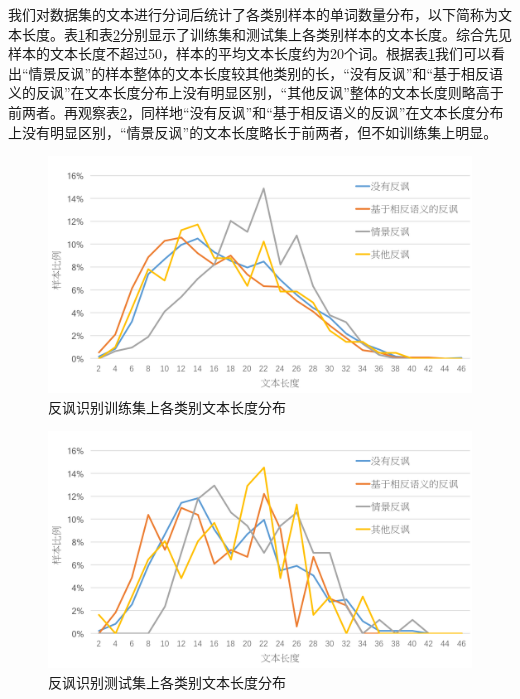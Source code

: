 我们对数据集的文本进行分词后统计了各类别样本的单词数量分布，以下简称为文本长度。表\ref{fig:semeval2018_task3_train_class_len}和表\ref{fig:semeval2018_task3_test_class_len}分别显示了训练集和测试集上各类别样本的文本长度。综合先见样本的文本长度不超过50，样本的平均文本长度约为20个词。根据表\ref{fig:semeval2018_task3_train_class_len}我们可以看出“情景反讽”的样本整体的文本长度较其他类别的长，“没有反讽”和“基于相反语义的反讽”在文本长度分布上没有明显区别，“其他反讽”整体的文本长度则略高于前两者。再观察表\ref{fig:semeval2018_task3_test_class_len}，同样地“没有反讽”和“基于相反语义的反讽”在文本长度分布上没有明显区别，“情景反讽”的文本长度略长于前两者，但不如训练集上明显。

\begin{figure}[H]
  \centering
  \includegraphics[width=\textwidth]{img/semeval2018_task3_train_class_len.png}
  \caption{反讽识别训练集上各类别文本长度分布}
  \label{fig:semeval2018_task3_train_class_len}
\end{figure}

\begin{figure}[H]
  \centering
  \includegraphics[width=\textwidth]{img/semeval2018_task3_test_class_len.png}
  \caption{反讽识别测试集上各类别文本长度分布}
  \label{fig:semeval2018_task3_test_class_len}
\end{figure}

